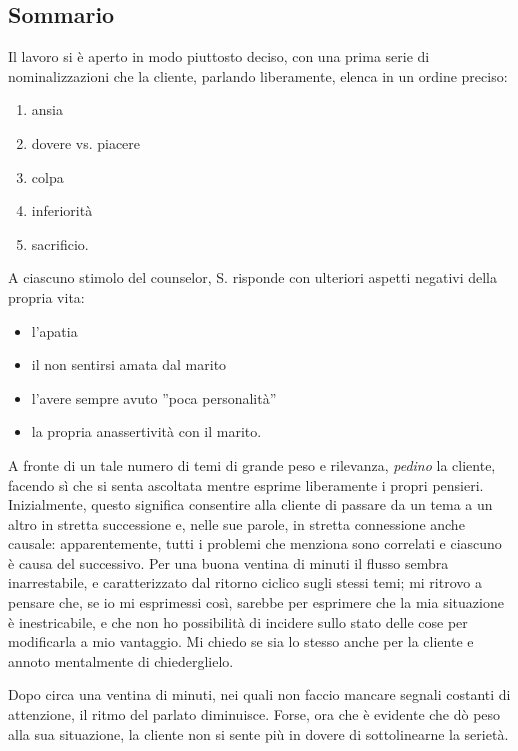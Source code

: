 \subsection{Sommario}
\label{ss:sommario}

Il lavoro si è aperto in modo piuttosto deciso, con una prima serie di nominalizzazioni che la cliente, parlando liberamente, elenca in un ordine preciso:
\begin{enumerate}
\item ansia
\item {}dovere vs. piacere
\item colpa
\item inferiorità
\item sacrificio.
\end{enumerate} 

A ciascuno stimolo del counselor, S. risponde con ulteriori aspetti negativi della propria vita: 
\begin{itemize}
\item l'apatia
\item il non sentirsi amata dal marito
\item l'avere sempre avuto ''poca personalità''
\item la propria anassertività con il marito.
\end{itemize} 

\noindent A fronte di un tale numero di temi di grande peso e rilevanza, \emph{pedino} la cliente, facendo sì che si senta ascoltata mentre esprime liberamente i propri pensieri. Inizialmente, questo significa consentire alla cliente di passare da un tema a un altro in stretta successione e, nelle sue parole, in stretta connessione anche causale: apparentemente, tutti i problemi che menziona sono correlati e ciascuno è causa del successivo. 
Per una buona ventina di minuti il flusso sembra inarrestabile, e caratterizzato dal ritorno ciclico sugli stessi temi; mi ritrovo a pensare%
 che, se io mi esprimessi così, sarebbe per esprimere che la mia situazione è inestricabile, e che non ho possibilità di incidere sullo stato delle cose per modificarla a mio vantaggio. Mi chiedo se sia lo stesso anche per la cliente e annoto mentalmente di chiederglielo.

Dopo circa una ventina di minuti, nei quali non faccio mancare segnali costanti di attenzione, il ritmo del parlato diminuisce. Forse, ora che è evidente che dò peso alla sua situazione, la cliente non si sente più in dovere di sottolinearne la serietà.

